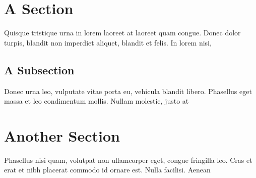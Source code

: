 \section{A Section}

Quisque tristique urna in lorem laoreet at laoreet quam congue. Donec dolor turpis, blandit non imperdiet aliquet, blandit et felis. In lorem nisi, 

\subsection{A Subsection}

Donec urna leo, vulputate vitae porta eu, vehicula blandit libero. Phasellus eget massa et leo condimentum mollis. Nullam molestie, justo at 

\section{Another Section}

Phasellus nisi quam, volutpat non ullamcorper eget, congue fringilla leo. Cras et erat et nibh placerat commodo id ornare est. Nulla facilisi. Aenean 